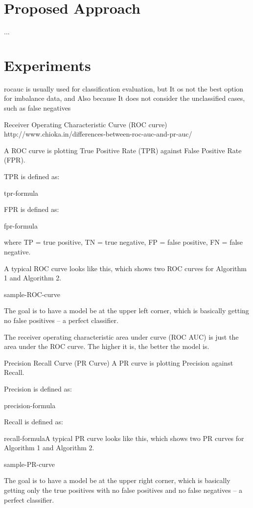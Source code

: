 \section{Proposed Approach}
\label{sec:4_proposal}

...

\section{Experiments}
\label{sec:4_experiments}

rocauc is usually used for classification evaluation, but It os not the best option for imbalance data, and Also because It does not consider the unclassified cases, such as false negatives

Receiver Operating Characteristic Curve (ROC curve) http://www.chioka.in/differences-between-roc-auc-and-pr-auc/

A ROC curve is plotting True Positive Rate (TPR) against False Positive Rate (FPR).

TPR is defined as:

tpr-formula

FPR is defined as:

fpr-formula

where TP = true positive, TN = true negative, FP = false positive, FN = false negative.

A typical ROC curve looks like this, which shows two ROC curves for Algorithm 1 and Algorithm 2.

sample-ROC-curve

The goal is to have a model be at the upper left corner, which is basically getting no false positives – a perfect classifier.

The receiver operating characteristic area under curve (ROC AUC) is just the area under the ROC curve. The higher it is, the better the model is.

Precision Recall Curve (PR Curve)
A PR curve is plotting Precision against Recall.

Precision is defined as:

precision-formula

Recall is defined as:

recall-formulaA typical PR curve looks like this, which shows two PR curves for Algorithm 1 and Algorithm 2.

sample-PR-curve

The goal is to have a model be at the upper right corner, which is basically getting only the true positives with no false positives and no false negatives – a perfect classifier.

